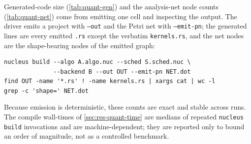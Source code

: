 Generated-code size (\cref{tab:quant-gen}) and the analysis-net node counts
(\cref{tab:quant-net}) come from emitting one cell and inspecting the output. The
driver emits a project with \texttt{--out} and the Petri net with \texttt{--emit-pn};
the generated lines are every emitted \texttt{.rs} except the verbatim
\texttt{kernels.rs}, and the net nodes are the shape-bearing nodes of the emitted
graph:

\begin{verbatim}
nucleus build --algo A.algo.nuc --sched S.sched.nuc \
              --backend B --out OUT --emit-pn NET.dot
find OUT -name '*.rs' ! -name kernels.rs | xargs cat | wc -l
grep -c 'shape=' NET.dot
\end{verbatim}

Because emission is deterministic, these counts are exact and stable across runs.
The compile wall-times of \cref{sec:res-quant-time} are medians of repeated
\texttt{nucleus build} invocations and are machine-dependent; they are reported only
to bound an order of magnitude, not as a controlled benchmark.
